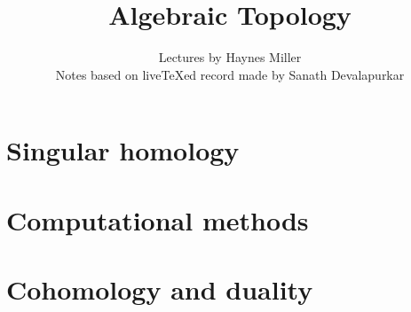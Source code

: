 \documentclass[11pt]{memoir}
\begin{document}
\title{Algebraic Topology}
\author{Lectures by Haynes Miller\\
Notes based on live{\TeX}ed record made by Sanath Devalapurkar

}

\frontmatter

\maketitle

\newpage
\tableofcontents
\newpage

\mainmatter

%

\chapter{Singular homology}














\chapter{Computational methods}













\chapter{Cohomology and duality}













\end{document}
